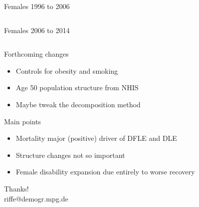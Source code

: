 \documentclass[20pt,usenames,dvipsnames]{beamer}
\begin{document}
\begin{frame}[plain]
\Large
  \begin{center}
  Females 1996 to 2006  \vspace{1em}
  
    \begin{tabular}{rrr|r}
      
     \end{tabular}
  \end{center}
\end{frame}

\begin{frame}[plain]
\Large
  \begin{center}
  Females 2006 to 2014  \vspace{1em}
  
    \begin{tabular}{rrr|r}
      
     \end{tabular}
  \end{center}
\end{frame}


\begin{frame}[plain]
\Large
\begin{center}
Forthcoming changes \vspace{1em}

\begin{itemize}[<+->]
\item Controls for obesity and smoking
\item Age 50 population structure from NHIS
\item Maybe tweak the decomposition method
\end{itemize}
\end{center}
\end{frame}

\begin{frame}[plain]
\Large
\begin{center}
Main points \vspace{1em}

\begin{itemize}[<+->]
\item Mortality major (positive) driver of DFLE and DLE
\item Structure changes not so important
\item Female disability expansion due entirely to worse recovery
\end{itemize}
\pause
Thanks!\\
riffe@demogr.mpg.de
\end{center}
\end{frame}

\end{document}
